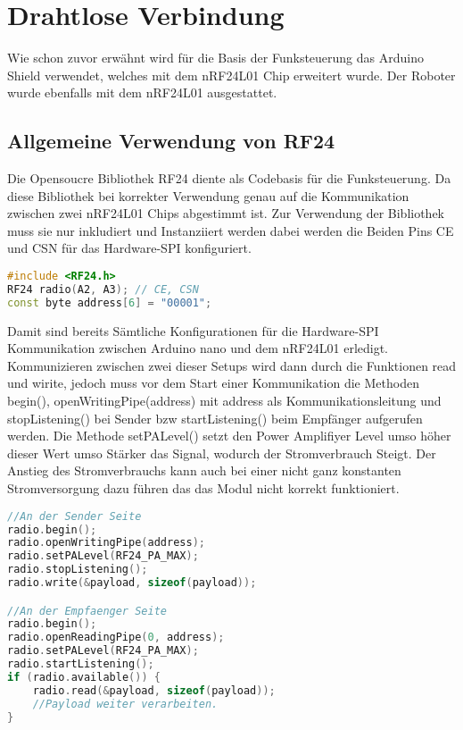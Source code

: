 \documentclass{article}
\begin{document}
\newpage
\section{Drahtlose Verbindung} %
    Wie schon zuvor erwähnt wird für die Basis der Funksteuerung das Arduino Shield verwendet, welches mit dem nRF24L01 Chip erweitert wurde. Der Roboter wurde ebenfalls mit dem nRF24L01 ausgestattet.
    \subsection{Allgemeine Verwendung von RF24} %
       Die Opensoucre Bibliothek RF24 \cite{RF24Lib} diente als Codebasis für die Funksteuerung. Da diese Bibliothek bei korrekter Verwendung genau auf die Kommunikation zwischen zwei nRF24L01 Chips abgestimmt ist.
       Zur Verwendung der Bibliothek muss sie nur inkludiert und Instanziiert werden dabei werden die Beiden Pins CE und CSN für das Hardware-SPI konfiguriert.
       
       \begin{file}[RF24 initialisieren]
        \begin{lstlisting}[language=C++]
#include <RF24.h>
RF24 radio(A2, A3); // CE, CSN
const byte address[6] = "00001";
        \end{lstlisting}
        \end{file}
        
        Damit sind bereits Sämtliche Konfigurationen für die Hardware-SPI Kommunikation zwischen Arduino nano und dem nRF24L01 erledigt.
        Kommunizieren zwischen zwei dieser Setups wird dann durch die Funktionen read und wirite,
        jedoch muss vor dem Start einer Kommunikation die Methoden begin(),
        openWritingPipe(address) mit address als Kommunikationsleitung und stopListening() bei Sender bzw startListening() beim Empfänger aufgerufen werden.
        Die Methode setPALevel() setzt den Power Amplifiyer Level umso höher dieser Wert umso Stärker das Signal,
        wodurch der Stromverbrauch Steigt.
        Der Anstieg des Stromverbrauchs kann auch bei einer nicht ganz konstanten Stromversorgung dazu führen das das Modul nicht korrekt funktioniert.
       \begin{file}[RF24 initialisieren]
        \begin{lstlisting}[language=C++]
//An der Sender Seite
radio.begin();
radio.openWritingPipe(address);
radio.setPALevel(RF24_PA_MAX);
radio.stopListening();
radio.write(&payload, sizeof(payload));

//An der Empfaenger Seite
radio.begin();
radio.openReadingPipe(0, address);
radio.setPALevel(RF24_PA_MAX); 
radio.startListening();
if (radio.available()) {
	radio.read(&payload, sizeof(payload));
	//Payload weiter verarbeiten.
}
        \end{lstlisting}
        \end{file} 
\end{document}
